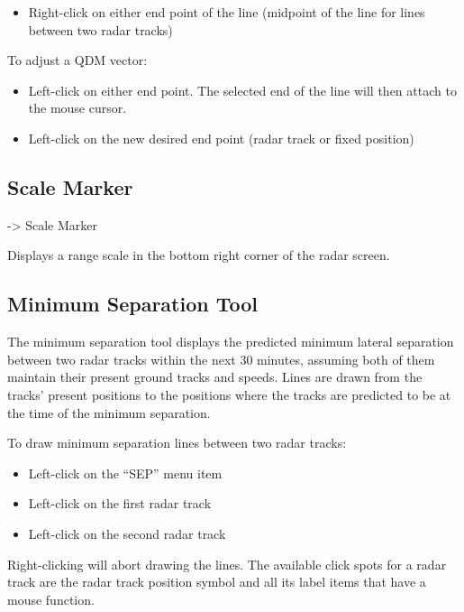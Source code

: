 \documentclass[a4paper,oneside,11pt]{memoir}
\begin{document}
\begin{itemize}
    \item Right-click on either end point of the line (midpoint of the line for lines between two radar tracks)
\end{itemize}

\bigskip

To adjust a QDM vector:

\begin{itemize}
    \item Left-click on either end point. The selected end of the line will then attach to the mouse cursor.
    \item Left-click on the new desired end point (radar track or fixed position)
\end{itemize}

\subsection{Scale Marker}
\label{scale}

 -> Scale Marker


Displays a range scale in the bottom right corner of the radar screen.

\subsection{Minimum Separation Tool}
\label{tool:mst}

The minimum separation tool displays the predicted minimum lateral separation between two radar tracks within the next 30 minutes, assuming both of them maintain their present ground tracks and speeds. Lines are drawn from the tracks’ present positions to the positions where the tracks are predicted to be at the time of the minimum separation.

To draw minimum separation lines between two radar tracks:
\begin{itemize}
    \item Left-click on the “SEP” menu item
    \item Left-click on the first radar track
    \item Left-click on the second radar track
\end{itemize}

\bigskip

Right-clicking will abort drawing the lines. The available click spots for a radar track are the radar track position symbol and all its label items that have a mouse function.
\end{document}
